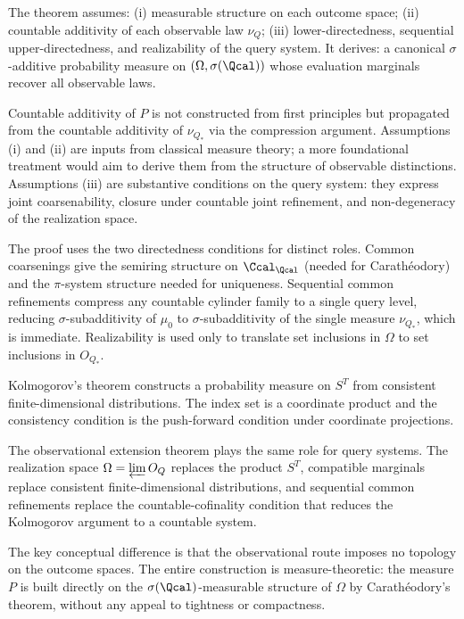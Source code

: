 \begin{remark}
The theorem assumes: (i) measurable structure on each outcome space;
(ii) countable additivity of each observable law $\nu_Q$; (iii)
lower-directedness, sequential upper-directedness, and realizability
of the query system. It derives: a canonical $\sigma$-additive
probability measure on $(\Omega,\sigma(\Qcal))$ whose evaluation
marginals recover all observable laws.

Countable additivity of $P$ is not constructed from first principles
but propagated from the countable additivity of $\nu_{Q_*}$ via the
compression argument. Assumptions (i) and (ii) are inputs from
classical measure theory; a more foundational treatment would aim to
derive them from the structure of observable distinctions. Assumptions
(iii) are substantive conditions on the query system: they express
joint coarsenability, closure under countable joint refinement, and
non-degeneracy of the realization space.
\end{remark}

\begin{remark}
The proof uses the two directedness conditions for distinct roles.
Common coarsenings give the semiring structure on $\Ccal_{\Qcal}$
(needed for Carathéodory) and the $\pi$-system structure needed for
uniqueness.  Sequential common refinements compress any countable
cylinder family to a single query level, reducing $\sigma$-subadditivity
of $\mu_0$ to $\sigma$-subadditivity of the single measure $\nu_{Q_*}$,
which is immediate.  Realizability is used only to translate set
inclusions in $\Omega$ to set inclusions in $O_{Q_*}$.
\end{remark}

\begin{remark}
Kolmogorov's theorem constructs a probability measure on $S^T$ from
consistent finite-dimensional distributions.  The index set is a
coordinate product and the consistency condition is the push-forward
condition under coordinate projections.

The observational extension theorem plays the same role for query
systems.  The realization space $\Omega=\varprojlim O_Q$ replaces the
product $S^T$, compatible marginals replace consistent
finite-dimensional distributions, and sequential common refinements
replace the countable-cofinality condition that reduces the Kolmogorov
argument to a countable system.

The key conceptual difference is that the observational route imposes
no topology on the outcome spaces.  The entire construction is
measure-theoretic: the measure $P$ is built directly on the
$\sigma(\Qcal)$-measurable structure of $\Omega$ by Carathéodory's
theorem, without any appeal to tightness or compactness.
\end{remark}

